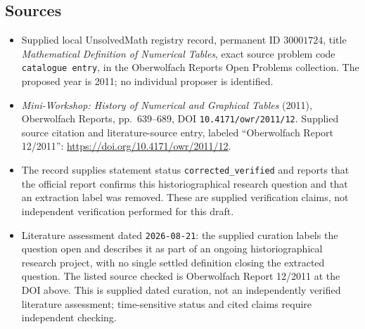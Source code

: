 \documentclass[11pt]{article}
\begin{document}
\subsection{Sources}
\begin{itemize}
\item Supplied local UnsolvedMath registry record, permanent ID \(30001724\), title \emph{Mathematical Definition of Numerical Tables}, exact source problem code \texttt{catalogue entry}, in the Oberwolfach Reports Open Problems collection. The proposed year is 2011; no individual proposer is identified.
\item \emph{Mini-Workshop: History of Numerical and Graphical Tables} (2011), Oberwolfach Reports, pp.\ 639--689, DOI \texttt{10.4171/owr/2011/12}. Supplied source citation and literature-source entry, labeled ``Oberwolfach Report 12/2011'': \url{https://doi.org/10.4171/owr/2011/12}.
\item The record supplies statement status \texttt{corrected\_verified} and reports that the official report confirms this historiographical research question and that an extraction label was removed. These are supplied verification claims, not independent verification performed for this draft.
\item Literature assessment dated \texttt{2026-08-21}: the supplied curation labels the question open and describes it as part of an ongoing historiographical research project, with no single settled definition closing the extracted question. The listed source checked is Oberwolfach Report 12/2011 at the DOI above. This is supplied dated curation, not an independently verified literature assessment; time-sensitive status and cited claims require independent checking.
\end{itemize}
\end{document}
